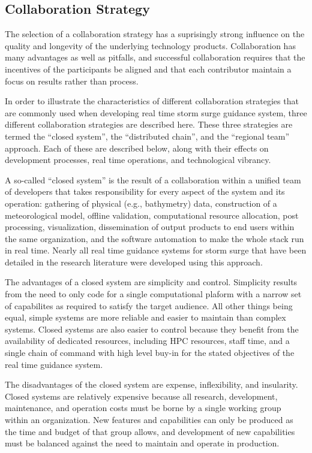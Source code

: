 \documentclass[jmse,article,submit,moreauthors,pdftex,12pt,a4paper]{mdpi}
\begin{document}
\subsection{Collaboration Strategy}

The selection of a collaboration strategy has a suprisingly strong 
influence on the quality and longevity of the underlying technology 
products. Collaboration has many advantages as well as pitfalls, and 
successful collaboration requires that the incentives of the 
participants be aligned and that each contributor maintain a focus 
on results rather than process. 

In order to illustrate the characteristics of different 
collaboration strategies that are commonly used when developing real 
time storm surge guidance system, three different collaboration 
strategies are described here. These three strategies are termed the 
``closed system'', the ``distributed chain'', and the ``regional 
team'' approach. Each of these are described below, along with their 
effects on development processes, real time operations, and 
technological vibrancy.

A so-called ``closed system'' is the result of a collaboration 
within a unified team of developers that takes responsibility for 
every aspect of the system and its operation: gathering of physical 
(e.g., bathymetry) data, construction of a meteorological model, 
offline validation, computational resource allocation, post 
processing, visualization, dissemination of output products to end 
users within the same organization, and the software automation to 
make the whole stack run in real time. Nearly all real time guidance 
systems for storm surge that have been detailed in the research 
literature were developed using this approach.

The advantages of a closed system are simplicity and control. 
Simplicity results from the need to only code for a single 
computational plaform with a narrow set of capabilites as required 
to satisfy the target audience. All other things being equal, simple 
systems are more reliable and easier to maintain than complex 
systems. Closed systems are also easier to control because they 
benefit from the availability of dedicated resources, including HPC 
resources, staff time, and a single chain of command with high level 
buy-in for the stated objectives of the real time guidance system.

The disadvantages of the closed system are expense, inflexibility, 
and insularity. Closed systems are relatively expensive because all 
research, development, maintenance, and operation costs must be 
borne by a single working group within an organization. New features 
and capabilities can only be produced as the time and budget of that 
group allows, and development of new capabilities must be balanced 
against the need to maintain and operate in production.
\end{document}
